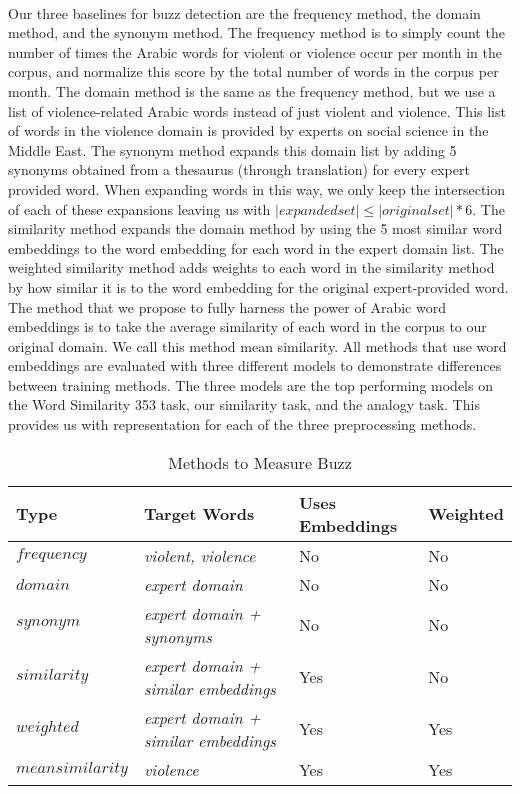 \\
Our three baselines for buzz detection are the frequency method, the domain method, and the synonym method. The frequency method is to simply count the number of times the Arabic words for violent or violence occur per month in the corpus, and normalize this score by the total number of words in the corpus per month. The domain method is the same as the frequency method, but we use a list of violence-related Arabic words instead of just violent and violence. This list of words in the violence domain is provided by experts on social science in the Middle East. The synonym method expands this domain list by adding 5 synonyms obtained from a thesaurus (through translation) for every expert provided word. When expanding words in this way, we only keep the intersection of each of these expansions leaving us with $|expanded set| \leq |original set| * 6$. The similarity method expands the domain method by using the 5 most similar word embeddings to the word embedding for each word in the expert domain list. The weighted similarity method adds weights to each word in the similarity method by how similar it is to the word embedding for the original expert-provided word. The method that we propose to fully harness the power of Arabic word embeddings is to take the average similarity of each word in the corpus to our original domain. We call this method mean similarity. All methods that use word embeddings are evaluated with three different models to demonstrate differences between training methods. The three models are the top performing models on the Word Similarity 353 task, our similarity task, and the analogy task. This provides us with representation for each of the three preprocessing methods.

\begin{table}
\begin{center}
\begin{tabular}{l|l|l|l}
\textbf{Type} & \textbf{Target Words} & \textbf{Uses Embeddings} & \textbf{Weighted} \\
\hline
$frequency$ & \textit{violent, violence} & No & No \\
$domain$ & \textit{expert domain} & No & No \\
$synonym$ & \textit{expert domain + synonyms} & No & No \\
$similarity$ & \textit{expert domain + similar embeddings} & Yes & No \\
$weighted$ & \textit{expert domain + similar embeddings} & Yes & Yes \\
$mean similarity$ & \textit{violence} & Yes & Yes \\
\end{tabular}
\caption{Methods to Measure Buzz}
\label{table:buzztypes}
\end{center}
\end{table}


